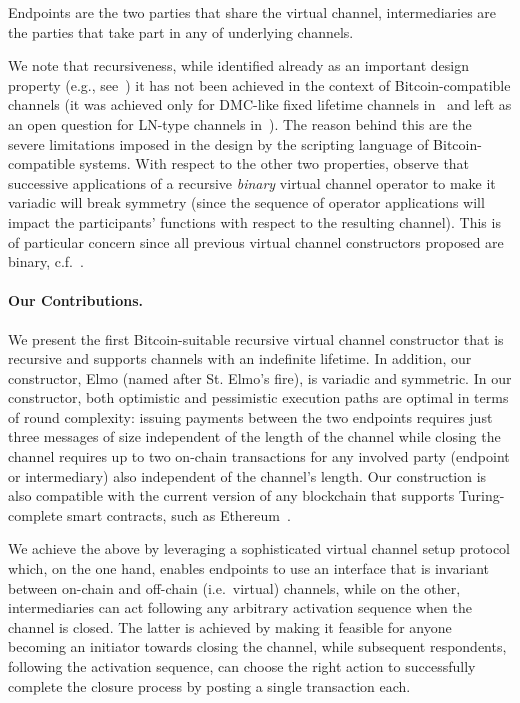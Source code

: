 Endpoints are the two parties that share the virtual channel, intermediaries are
the parties that take part in any of underlying channels.

We note that recursiveness, while identified already as an important design property (e.g., see~\cite{DBLP:conf/ccs/DziembowskiFH18}) it has not been achieved in the context of Bitcoin-compatible channels 
(it was achieved only for DMC-like fixed lifetime channels in~\cite{10.1007/978-3-030-65411-5_18} and left as an open question for LN-type channels in~\cite{cryptoeprint:2020:554}).
The reason behind this are the severe limitations imposed in the design by the scripting language of Bitcoin-compatible systems. 
%
With respect to the other two properties, observe that successive applications
of a recursive {\em binary} virtual channel operator to make it variadic will
break symmetry (since the sequence of operator applications will impact the
participants' functions with respect to the resulting channel). This is of
particular concern since all previous virtual channel constructors proposed are
binary, c.f.~\cite{DBLP:conf/ccs/DziembowskiFH18,cryptoeprint:2020:554,10.1007/978-3-030-65411-5_18}.

\paragraph{Our Contributions.}  We present  the first  Bitcoin-suitable
recursive virtual channel constructor that is recursive and supports channels
with an indefinite lifetime. In addition, our constructor, Elmo (named after St.
Elmo's fire), is variadic and symmetric. In our constructor, both optimistic and pessimistic execution paths are optimal in terms of round complexity: issuing payments between the two endpoints requires just three messages of size independent of the length of the channel while
closing the channel requires up to two on-chain transactions for any involved
party (endpoint or intermediary) also independent of the channel's length. Our
construction is also compatible with the current version of any blockchain that
supports Turing-complete smart contracts, such as
Ethereum~\cite{wood2014ethereum}.

We achieve the above by leveraging a sophisticated virtual channel setup
protocol which, on the one hand, enables endpoints to use an interface that is
invariant between on-chain and off-chain (i.e.\ virtual) channels,
while on the other, intermediaries can act following any arbitrary activation sequence when the channel is closed. The latter is achieved by making it feasible for anyone becoming an initiator towards closing the channel, while subsequent respondents, following the activation sequence, can choose the right action to successfully complete the closure process by posting a single transaction each.

